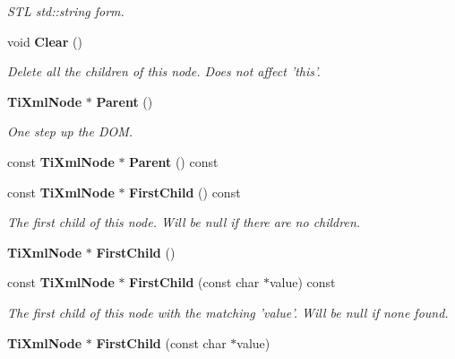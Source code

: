 \begin{CompactItemize}
\begin{CompactList}\small\item\em STL std::string form. \item\end{CompactList}\item 
void {\bf Clear} ()\label{classTiXmlNode_TiXmlUnknowna11}

\begin{CompactList}\small\item\em Delete all the children of this node. Does not affect 'this'. \item\end{CompactList}\item 
{\bf Ti\-Xml\-Node} $\ast$ {\bf Parent} ()\label{classTiXmlNode_TiXmlUnknowna12}

\begin{CompactList}\small\item\em One step up the DOM. \item\end{CompactList}\item 
const {\bf Ti\-Xml\-Node} $\ast$ {\bf Parent} () const\label{classTiXmlNode_TiXmlUnknowna13}

\item 
const {\bf Ti\-Xml\-Node} $\ast$ {\bf First\-Child} () const\label{classTiXmlNode_TiXmlUnknowna14}

\begin{CompactList}\small\item\em The first child of this node. Will be null if there are no children. \item\end{CompactList}\item 
{\bf Ti\-Xml\-Node} $\ast$ {\bf First\-Child} ()\label{classTiXmlNode_TiXmlUnknowna15}

\item 
const {\bf Ti\-Xml\-Node} $\ast$ {\bf First\-Child} (const char $\ast$value) const\label{classTiXmlNode_TiXmlUnknowna16}

\begin{CompactList}\small\item\em The first child of this node with the matching 'value'. Will be null if none found. \item\end{CompactList}\item 
{\bf Ti\-Xml\-Node} $\ast$ {\bf First\-Child} (const char $\ast$value)\label{classTiXmlNode_TiXmlUnknowna17}


\end{CompactItemize}
